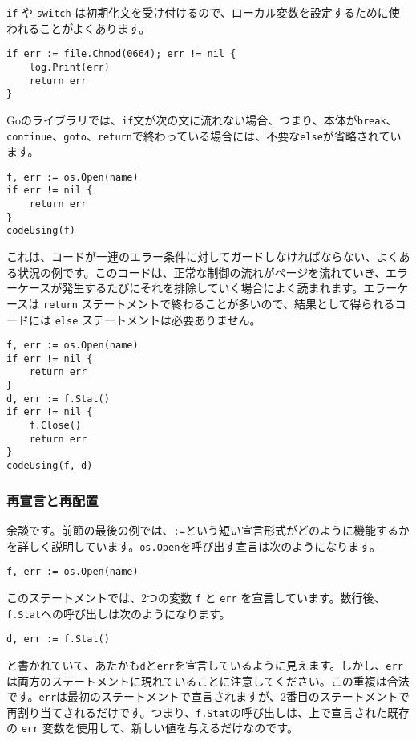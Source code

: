 \documentclass{jsarticle}
\begin{document}
\texttt{if} や \texttt{switch}
は初期化文を受け付けるので、ローカル変数を設定するために使われることがよくあります。

\begin{lstlisting}[numbers=none]
if err := file.Chmod(0664); err != nil {
    log.Print(err)
    return err
}
\end{lstlisting}

Goのライブラリでは、\texttt{if}文が次の文に流れない場合、つまり、本体が\texttt{break}、\texttt{continue}、\texttt{goto}、\texttt{return}で終わっている場合には、不要な\texttt{else}が省略されています。

\begin{lstlisting}[numbers=none]
f, err := os.Open(name)
if err != nil {
    return err
}
codeUsing(f)
\end{lstlisting}

これは、コードが一連のエラー条件に対してガードしなければならない、よくある状況の例です。このコードは、正常な制御の流れがページを流れていき、エラーケースが発生するたびにそれを排除していく場合によく読まれます。エラーケースは
\texttt{return}
ステートメントで終わることが多いので、結果として得られるコードには
\texttt{else} ステートメントは必要ありません。

\begin{lstlisting}[numbers=none]
f, err := os.Open(name)
if err != nil {
    return err
}
d, err := f.Stat()
if err != nil {
    f.Close()
    return err
}
codeUsing(f, d)
\end{lstlisting}

\subsubsection{再宣言と再配置}

余談です。前節の最後の例では、\texttt{:=}という短い宣言形式がどのように機能するかを詳しく説明しています。\texttt{os.Open}を呼び出す宣言は次のようになります。

\begin{lstlisting}[numbers=none]
f, err := os.Open(name)
\end{lstlisting}

このステートメントでは、2つの変数 \texttt{f} と \texttt{err}
を宣言しています。数行後、\texttt{f.Stat}への呼び出しは次のようになります。

\begin{lstlisting}[numbers=none]
d, err := f.Stat()
\end{lstlisting}

と書かれていて、あたかも\texttt{d}と\texttt{err}を宣言しているように見えます。しかし、\texttt{err}は両方のステートメントに現れていることに注意してください。この重複は合法です。\texttt{err}は最初のステートメントで宣言されますが、2番目のステートメントで再割り当てされるだけです。つまり、\texttt{f.Stat}の呼び出しは、上で宣言された既存の
\texttt{err} 変数を使用して、新しい値を与えるだけなのです。
\end{document}
